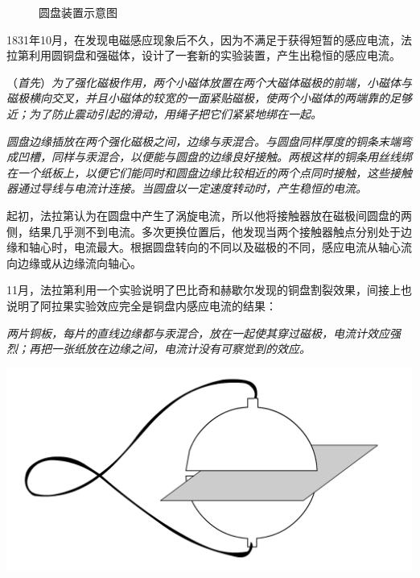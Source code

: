 \documentclass{CLGPY}
\begin{document}
\begin{multicols}{1}
\begin{figure}[H]
\begin{minipage}{.47\linewidth}
                \caption{圆盘装置示意图\label{fig:99}}
            \end{minipage}
        \end{figure}
\newpage
        1831年10月，在发现电磁感应现象后不久，因为不满足于获得短暂的感应电流，法拉第利用圆铜盘和强磁体，设计了一套新的实验装置，产生出稳恒的感应电流。

        （\emph{首先}）\emph{为了强化磁极作用，两个小磁体放置在两个大磁体磁极的前端，小磁体与磁极横向交叉，并且小磁体的较宽的一面紧贴磁极，使两个小磁体的两端靠的足够近；为了防止震动引起的滑动，用绳子把它们紧紧地绑在一起。}

        \emph{圆盘边缘插放在两个强化磁极之间，边缘与汞混合。与圆盘同样厚度的铜条末端弯成凹槽，同样与汞混合，以便能与圆盘的边缘良好接触。两根这样的铜条用丝线绑在一个纸板上，以便它们能同时和圆盘边缘比较相近的两个点同时接触，这些接触器通过导线与电流计连接。当圆盘以一定速度转动时，产生稳恒的电流。}

        

        起初，法拉第认为在圆盘中产生了涡旋电流，所以他将接触器放在磁极间圆盘的两侧，结果几乎测不到电流。多次更换位置后，他发现当两个接触器触点分别处于边缘和轴心时，电流最大。根据圆盘转向的不同以及磁极的不同，感应电流从轴心流向边缘或从边缘流向轴心。

        11月，法拉第利用一个实验说明了巴比奇和赫歇尔发现的铜盘割裂效果，间接上也说明了阿拉果实验效应完全是铜盘内感应电流的结果：

        \emph{两片铜板，每片的直线边缘都与汞混合，放在一起使其穿过磁极，电流计效应强烈；再把一张纸放在边缘之间，电流计没有可察觉到的效应。}

        \begin{center}
            \includegraphics[scale=.14]{./fig/20210615103816.png}
        \end{center}
   

\end{multicols}
\end{document}
